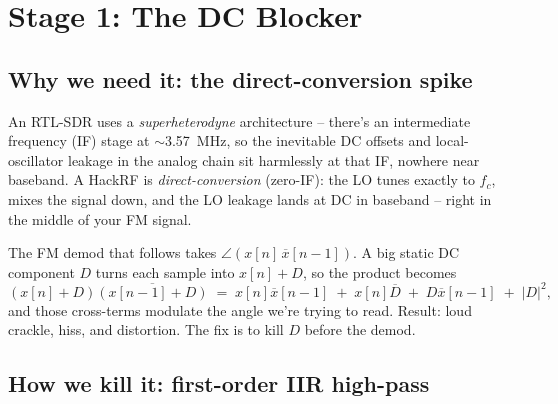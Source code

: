 \documentclass[11pt,a4paper]{article}
\begin{document}
\section{Stage 1: The DC Blocker}

\subsection{Why we need it: the direct-conversion spike}

An RTL-SDR uses a \emph{superheterodyne} architecture -- there's an
intermediate frequency (IF) stage at $\sim$\SI{3.57}{MHz}, so the
inevitable DC offsets and local-oscillator leakage in the analog chain
sit harmlessly at that IF, nowhere near baseband.  A HackRF is
\emph{direct-conversion} (zero-IF): the LO tunes exactly to \(f_c\),
mixes the signal down, and the LO leakage lands at DC in baseband --
right in the middle of your FM signal.

\begin{center}
\end{center}

The FM demod that follows takes \(\angle(x[n]\,\overline{x}[n{-}1])\).
A big static DC component \(D\) turns each sample into \(x[n]+D\), so
the product becomes
\begin{equation}
(x[n]+D)\overline{(x[n{-}1]+D)}
\;=\;
x[n]\overline{x}[n{-}1] \;+\; x[n]\overline{D} \;+\; D\overline{x}[n{-}1] \;+\; |D|^2,
\end{equation}
and those cross-terms modulate the angle we're trying to read.  Result:
loud crackle, hiss, and distortion.  The fix is to kill \(D\) before
the demod.

\subsection{How we kill it: first-order IIR high-pass}
\end{document}
